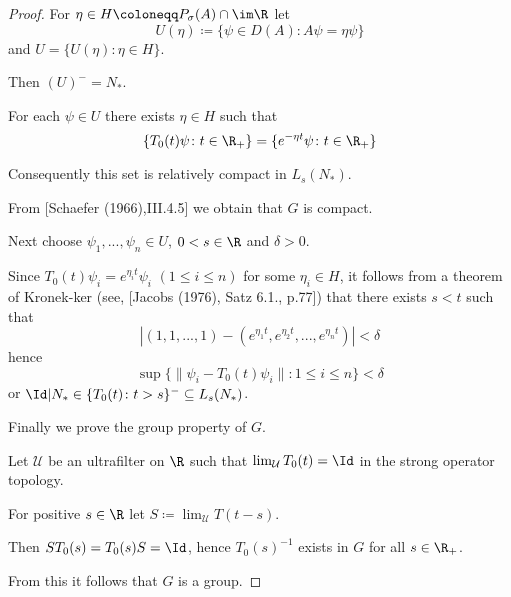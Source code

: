 \begin{proof}
For $\eta \in H \coloneqq P_{\sigma}(A) \cap \im\R$ let
\[
U(\eta) \coloneqq \{\psi \in D(A): A\psi = \eta\psi\}
\]
and $U = \{U(\eta) \colon \eta \in H\}$.

Then $(U)^{-} = N_{*}$.

For each $\psi \in U$ there exists $\eta \in H$ such that
\[
\{T_{0}(t)\psi \colon t \in \R_{+}\} = \{e^{-\eta t}\psi \colon t \in \R_{+}\}
\]

Consequently this set is relatively compact in $L_{s}(N_{*})$.

From [Schaefer (1966),III.4.5] we obtain that $G$ is compact.

Next choose $\psi_{1}, ..., \psi_{n} \in U$, $0 < s \in \R$ and $\delta > 0$.

Since $T_{0}(t)\psi_{i} = e^{\eta_{i}t}\psi_{i}$ $(1 \leq i \leq n)$ for some $\eta_{i} \in H$, it follows from a theorem of Kronek-ker (see, [Jacobs (1976), Satz 6.1., p.77]) that there exists $s < t$ such that
\[
|(1,1, ..., 1) - (e^{\eta_{1}t}, e^{\eta_{2}t}, ..., e^{\eta_{n}t})| < \delta
\]
hence
\[
\sup\{\|\psi_{i} - T_{0}(t)\psi_{i}\| \colon 1 \leq i \leq n\} < \delta
\]
or $\Id|N_{*} \in \{T_{0}(t) \colon t>s\}^{-} \subseteq L_{s}(N_{*})$.






Finally we prove the group property of $G$.

Let $\mathcal{U}$ be an ultrafilter on $\R$ such that $\lim_{\mathcal{U}}T_{0}(t) = \Id$ in the strong operator topology.

For positive $s \in \R$ let $S \coloneqq \lim_{\mathcal{U}}T(t-s)$.

Then $ST_{0}(s) = T_{0}(s)S = \Id$, hence $T_{0}(s)^{-1}$ exists in $G$ for all $s \in \R_{+}$.

From this it follows that $G$ is a group.
\end{proof}

